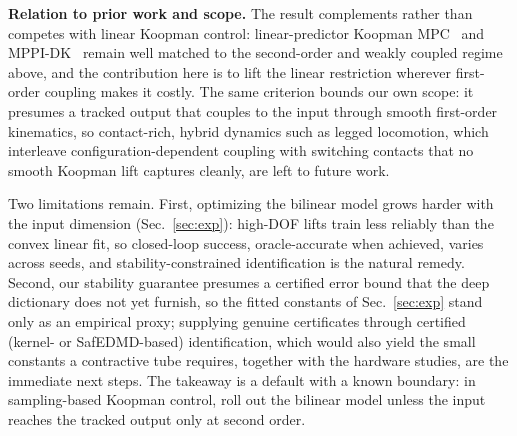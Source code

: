 \documentclass[lettersize,journal]{IEEEtran}
\theoremstyle{remark}
\begin{document}
\textbf{Relation to prior work and scope.}
The result complements rather than competes with linear Koopman control: linear-predictor Koopman MPC~\cite{korda2018mpc,strasser2026} and MPPI-DK~\cite{mppidk2026} remain well matched to the second-order and weakly coupled regime above, and the contribution here is to lift the linear restriction wherever first-order coupling makes it costly.
The same criterion bounds our own scope: it presumes a tracked output that couples to the input through smooth first-order kinematics, so contact-rich, hybrid dynamics such as legged locomotion, which interleave configuration-dependent coupling with switching contacts that no smooth Koopman lift captures cleanly, are left to future work.

Two limitations remain.
First, optimizing the bilinear model grows harder with the input dimension (Sec.~\ref{sec:exp}): high-DOF lifts train less reliably than the convex linear fit, so closed-loop success, oracle-accurate when achieved, varies across seeds, and stability-constrained identification is the natural remedy.
Second, our stability guarantee presumes a certified error bound that the deep dictionary does not yet furnish, so the fitted constants of Sec.~\ref{sec:exp} stand only as an empirical proxy; supplying genuine certificates through certified (kernel- or SafEDMD-based) identification, which would also yield the small constants a contractive tube requires, together with the hardware studies, are the immediate next steps.
The takeaway is a default with a known boundary: in sampling-based Koopman control, roll out the bilinear model unless the input reaches the tracked output only at second order.



\end{document}
